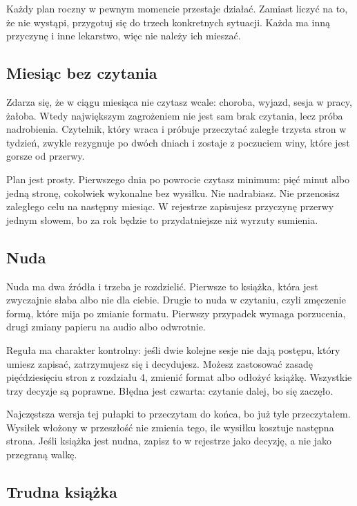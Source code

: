 Każdy plan roczny w pewnym momencie przestaje działać. Zamiast liczyć na to, że nie wystąpi, przygotuj się do trzech konkretnych sytuacji. Każda ma inną przyczynę i inne lekarstwo, więc nie należy ich mieszać.

\subsection{Miesiąc bez czytania}

Zdarza się, że w ciągu miesiąca nie czytasz wcale: choroba, wyjazd, sesja w pracy, żałoba. Wtedy największym zagrożeniem nie jest sam brak czytania, lecz próba nadrobienia. Czytelnik, który wraca i próbuje przeczytać zaległe trzysta stron w tydzień, zwykle rezygnuje po dwóch dniach i zostaje z poczuciem winy, które jest gorsze od przerwy.

Plan jest prosty. Pierwszego dnia po powrocie czytasz minimum: pięć minut albo jedną stronę, cokolwiek wykonalne bez wysiłku. Nie nadrabiasz. Nie przenosisz zaległego celu na następny miesiąc. W rejestrze zapisujesz przyczynę przerwy jednym słowem, bo za rok będzie to przydatniejsze niż wyrzuty sumienia.

\subsection{Nuda}

Nuda ma dwa źródła i trzeba je rozdzielić. Pierwsze to książka, która jest zwyczajnie słaba albo nie dla ciebie. Drugie to nuda w czytaniu, czyli zmęczenie formą, które mija po zmianie formatu. Pierwszy przypadek wymaga porzucenia, drugi zmiany papieru na audio albo odwrotnie.

Reguła ma charakter kontrolny: jeśli dwie kolejne sesje nie dają postępu, który umiesz zapisać, zatrzymujesz się i decydujesz. Możesz zastosować zasadę pięćdziesięciu stron z rozdziału 4, zmienić format albo odłożyć książkę. Wszystkie trzy decyzje są poprawne. Błędna jest czwarta: czytanie dalej, bo się zaczęło.

\begin{falle}[Pułapka]
Najczęstsza wersja tej pułapki to \glqq przeczytam do końca, bo już tyle przeczytałem\grqq{}. Wysiłek włożony w przeszłość nie zmienia tego, ile wysiłku kosztuje następna strona. Jeśli książka jest nudna, zapisz to w rejestrze jako decyzję, a nie jako przegraną walkę.
\end{falle}

\subsection{Trudna książka}

